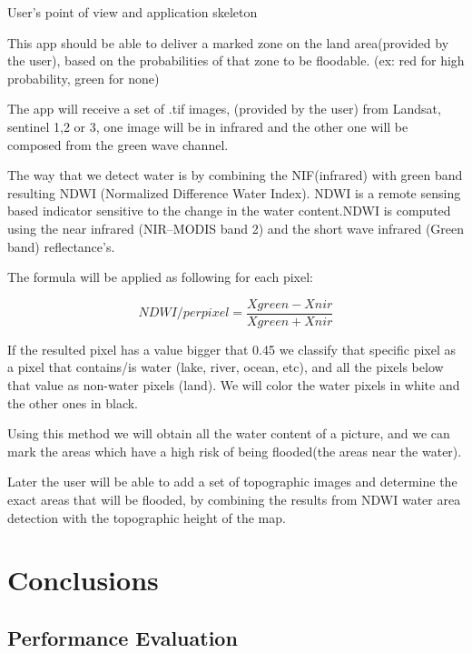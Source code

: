 \documentclass[12pt, a4paper]{report}
\begin{document}
{\Large User's point of view and application skeleton\par}

This app should be able to deliver a marked zone on the land area(provided by the user), based on the probabilities of that zone to be floodable. (ex: red for high probability, green for none)\par 

The app will receive a set of .tif images, (provided by the user) from Landsat, sentinel 1,2 or 3, one image will be in infrared and the other one will be composed from the green wave channel.\par
 The way that we detect water is by combining the NIF(infrared) with green band resulting NDWI (Normalized Difference Water Index). NDWI  is a remote sensing based indicator sensitive to the change in the water content.NDWI  is computed  using  the  near  infrared  (NIR–MODIS  band  2)  and  the  short  wave infrared (Green band) reflectance’s.\par 
The formula will be applied as following for each pixel:

$$ NDWI/perpixel = \frac{Xgreen - Xnir}{Xgreen + Xnir}$$

If the resulted pixel has a value bigger that 0.45 we classify that specific pixel as a pixel that contains/is water (lake, river, ocean, etc), and all the pixels below that value as non-water pixels (land). We will color the water pixels in white and the other ones in black. \par 

Using this method we will obtain all the water content of a picture, and we can mark the areas which have a high risk of being flooded(the areas near the water). \par 

Later the user will be able to add a set of topographic images and determine the exact areas that will be flooded, by combining the results from NDWI water area detection with the topographic height of the map.




\newpage{}

\chapter{Conclusions}


\section{Performance Evaluation} 
\end{document}
